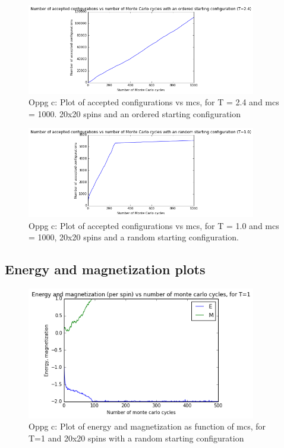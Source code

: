 \documentclass[twocolumn]{article}
\begin{document}
\begin{figure}[h!]
  \centering
  \caption{Oppg c: Plot of accepted configurations vs mcs, for T = 2.4 and mcs = 1000. 20x20 spins and an ordered starting configuration}
  \includegraphics[width=10cm]{configs_plot_2.png}
\end{figure}

\begin{figure}[h!]
  \centering
  \caption{Oppg c: Plot of accepted configurations vs mcs, for T = 1.0 and mcs = 1000, 20x20 spins and a random starting configuration.}
  \includegraphics[width=10cm]{configs_plot_3.png}
\end{figure}
\newpage

\newpage

\centering\subsection{Energy and magnetization plots}

\newpage

\newpage

\begin{figure}[h!]
  \centering
  \caption{Oppg c: Plot of energy and magnetization as function of mcs, for T=1 and 20x20 spins with a random starting configuration}
  \includegraphics[width=10cm]{E_M_plot_c_1.png}
\end{figure}
\end{document}
